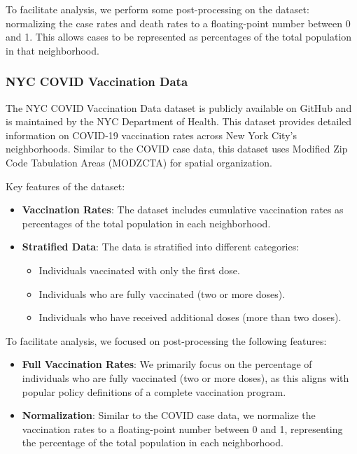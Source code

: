 \documentclass[10pt,journal,compsoc]{IEEEtran}
\begin{document}
To facilitate analysis, we perform some post-processing on the dataset: normalizing the case rates and death rates to a floating-point number between 0 and 1. This allows cases to be represented as percentages of the total population in that neighborhood.

\subsubsection{NYC COVID Vaccination Data}

The NYC COVID Vaccination Data dataset \cite{vaxdatanyc} is publicly available on GitHub and is maintained by the NYC Department of Health. This dataset provides detailed information on COVID-19 vaccination rates across New York City's neighborhoods. Similar to the COVID case data, this dataset uses Modified Zip Code Tabulation Areas (MODZCTA) for spatial organization.

Key features of the dataset:
\begin{itemize}
    \item \textbf{Vaccination Rates}: The dataset includes cumulative vaccination rates as percentages of the total population in each neighborhood.
    \item \textbf{Stratified Data}: The data is stratified into different categories:
    \begin{itemize}
        \item Individuals vaccinated with only the first dose.
        \item Individuals who are fully vaccinated (two or more doses).
        \item Individuals who have received additional doses (more than two doses).
    \end{itemize}
\end{itemize}

To facilitate analysis, we focused on post-processing the following features:
\begin{itemize}
    \item \textbf{Full Vaccination Rates}: We primarily focus on the percentage of individuals who are fully vaccinated (two or more doses), as this aligns with popular policy definitions of a complete vaccination program.
    \item \textbf{Normalization}: Similar to the COVID case data, we normalize the vaccination rates to a floating-point number between 0 and 1, representing the percentage of the total population in each neighborhood.
\end{itemize}
\end{document}
